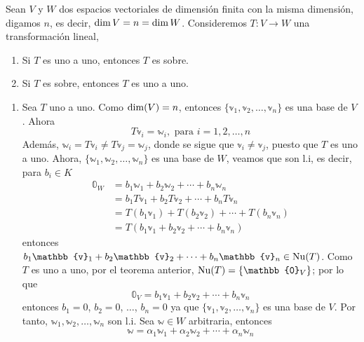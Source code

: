 \begin{theorem}\label{theo:unoauno-sobre}
    Sean $V$ y $W$ dos espacios vectoriales de dimensión finita con la misma dimensión, digamos $n$, es decir, $\operatorname{dim} V = n = \operatorname{dim} W$. Consideremos $T: V \longrightarrow W$ una transformación lineal,\newpage
    \begin{enumerate}[label=\roman*)]
        \item Si $T$ es uno a uno, entonces $T$ es sobre.
        \item Si $T$ es sobre, entonces $T$ es uno a uno.
    \end{enumerate}
    \demostracion
    \begin{enumerate}[label=\roman*)]
        \item Sea $T$ uno a uno. Como $\operatorname{dim}(V) = n$, entonces $\{ \mathbb{v}_1,  \mathbb{v}_2,  \dots,  \mathbb{v}_n \}$ es una base de $V$. Ahora
        $$T\mathbb{v}_i = \mathbb{w}_i, \text{ para } i = 1, 2, \dots, n$$
        Además, $\mathbb{w}_i = T\mathbb{v}_i \neq T\mathbb{v}_j = \mathbb{w}_j$, donde se sigue que $\mathbb{v}_i \neq \mathbb{v}_j$, puesto que $T$ es uno a uno. Ahora, $\{ \mathbb{w}_1, \mathbb{w}_2, \dots,  \mathbb{w}_n \}$ es una base de $W$, veamos que son l.i, es decir, para $b_i \in K$
        \begin{align*}
            \mathbb{0}_W & = b_1\mathbb{w}_1 + b_2\mathbb{w}_2 + \cdots + b_n \mathbb{w}_n \\
            & = b_1T\mathbb{v}_1 + b_2T\mathbb{v}_2 + \cdots + b_nT\mathbb{v}_n \\
            & = T(b_1\mathbb{v}_1) + T(b_2\mathbb{v}_2) + \cdots + T(b_n\mathbb{v}_n) \\
            & = T(b_1\mathbb{v}_1 + b_2\mathbb{v}_2 + \cdots + b_n\mathbb{v}_n)
        \end{align*}
        entonces $b_1\mathbb{v}_1 + b_2\mathbb{v}_2 + \cdots + b_n\mathbb{v}_n \in \Nuc(T)$. Como $T$ es uno a uno, por el teorema anterior, $\Nuc(T) = \{ \mathbb{0}_V \}$; por lo que
        $$\mathbb{0}_V = b_1\mathbb{v}_1 + b_2\mathbb{v}_2 + \cdots + b_n\mathbb{v}_n$$
        entonces $b_1 = 0$, $b_2 = 0$, $\dots$, $b_n = 0$ ya que $\{ \mathbb{v}_1,  \mathbb{v}_2,  \dots,  \mathbb{v}_n \}$ es una base de $V$. Por tanto, $\mathbb{w}_1,  \mathbb{w}_2,  \dots,  \mathbb{w}_n$ son l.i. Sea $\mathbb{w} \in W$ arbitraria, entonces
        \begin{equation}
            \mathbb{w} = \alpha_1 \mathbb{w}_1 + \alpha_2 \mathbb{w}_2 + \cdots + \alpha_n \mathbb{w}_n \label{JHDFHGBSDHFGHDSGFHGH}
        \end{equation}

\end{enumerate}
\end{theorem}
